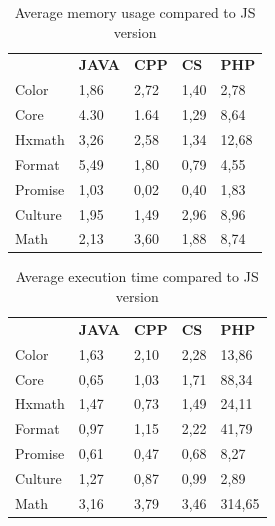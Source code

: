 \begin{table}[]
	\centering
	
	\begin{tabular}{|l|l|l|l|l|}
		\hline
		& \textbf{JAVA} & \textbf{CPP}  & \textbf{CS}   & \textbf{PHP}   \\ \hhline{|=|=|=|=|=|}
		Color   & 1,86 & 2,72 & 1,40 & 2,78  \\ \hline
		Core    & 4.30 & 1.64 & 1,29 & 8,64  \\ \hline
		Hxmath  & 3,26 & 2,58 & 1,34 & 12,68 \\ \hline
		Format  & 5,49 & 1,80 & 0,79 & 4,55  \\ \hline
		Promise & 1,03 & 0,02 & 0,40 & 1,83  \\ \hline
		Culture & 1,95 & 1,49 & 2,96 & 8,96  \\ \hline
		Math    & 2,13 & 3,60 & 1,88 & 8,74  \\ \hline
	\end{tabular}
	\caption{Average memory usage compared to JS version}
	\label{my-label}
\end{table}
\begin{table}[]
	\centering
	
	\begin{tabular}{|l|l|l|l|l|}
		\hline
		& \textbf{JAVA} & \textbf{CPP}  & \textbf{CS}   & \textbf{PHP}    \\ 	\hhline{|=|=|=|=|=|}
		Color   & 1,63 & 2,10 & 2,28 & 13,86  \\ \hline
		Core    & 0,65 & 1,03 & 1,71 & 88,34  \\ \hline
		Hxmath  & 1,47 & 0,73 & 1,49 & 24,11  \\ \hline
		Format  & 0,97 & 1,15 & 2,22 & 41,79  \\ \hline
		Promise & 0,61 & 0,47 & 0,68 & 8,27   \\ \hline
		Culture & 1,27 & 0,87 & 0,99 & 2,89   \\ \hline
		Math    & 3,16 & 3,79 & 3,46 & 314,65 \\ \hline
	\end{tabular}
	\caption{Average execution time compared to JS version}
	\label{my-label}
\end{table}


